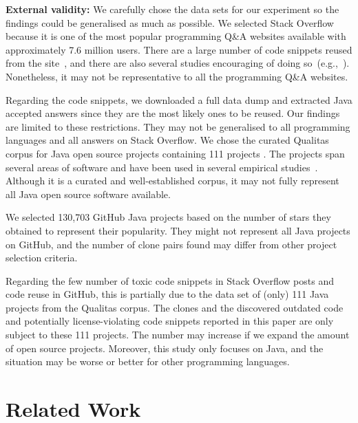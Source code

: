 \documentclass[10pt,journal,compsoc]{IEEEtran}
\begin{document}
\textbf{External validity:} We carefully chose the data sets for our
experiment so the findings could be generalised as much as possible.
We selected Stack Overflow because it is one of the most popular
programming Q\&A websites available with approximately 7.6 million
users. There are a large number of code snippets reused from the
site~\cite{An2017}, and there are also several studies encouraging of
doing
so~(e.g.,~\cite{Ponzanelli2013,Ponzanelli2014,Keivanloo2014,Park2014}).
Nonetheless, it may not be representative to all the programming Q\&A
websites.

Regarding the code snippets, we downloaded a full data dump and extracted Java
accepted answers since they are the most likely ones to be reused. Our findings
are limited to these restrictions. They may not be generalised to all
programming languages and all answers on Stack Overflow. We chose the curated
Qualitas corpus for Java open source projects containing 111 projects
\cite{QualitasCorpus}. 
The projects span several areas of software and have been used in several empirical
studies~\cite{Taube-Schock2011,Beckman2011,Vasilescu2011,Omar2012}. Although it
is a curated and well-established corpus, it may not fully represent all Java
open source software available. 

We selected 130,703 GitHub Java projects
based on the number of stars they obtained to represent their popularity. They
might not represent all Java projects on GitHub, and the number of clone pairs
found may differ from other project selection criteria.

Regarding the few number of toxic code snippets in Stack Overflow posts and code reuse in
GitHub, this is partially due to the data set of (only) 111 Java projects from
the Qualitas corpus. The clones and the discovered outdated code and
potentially license-violating code snippets reported in this paper are only
subject to these 111 projects. The number may increase if we expand the amount
of open source projects. Moreover, this study only focuses on Java, and the
situation may be worse or better for other programming languages.

\section{Related Work}
\end{document}
